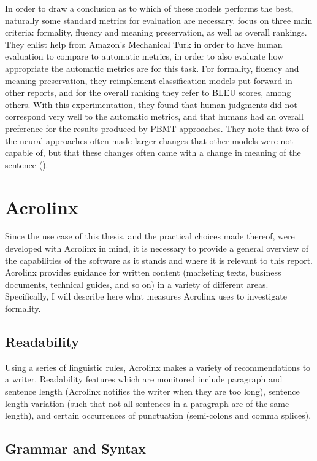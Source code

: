 In order to draw a conclusion as to which of these models performs the best, naturally some standard metrics for evaluation are necessary. \cite{rao2018gyafc} focus on three main criteria: formality, fluency and meaning preservation, as well as overall rankings. They enlist help from Amazon's Mechanical Turk in order to have human evaluation to compare to automatic metrics, in order to also evaluate how appropriate the automatic metrics are for this task. For formality, fluency and meaning preservation, they reimplement classification models put forward in other reports, and for the overall ranking they refer to BLEU scores, among others. With this experimentation, they found that human judgments did not correspond very well to the automatic metrics, and that humans had an overall preference for the results produced by PBMT approaches. They note that two of the neural approaches often made larger changes that other models were not capable of, but that these changes often came with a change in meaning of the sentence (\cite{rao2018gyafc}).

\section{Acrolinx} \label{acrolinx}

Since the use case of this thesis, and the practical choices made thereof, were developed with Acrolinx in mind, it is necessary to provide a general overview of the capabilities of the software as it stands and where it is relevant to this report. Acrolinx provides guidance for written content (marketing texts, business documents, technical guides, and so on) in a variety of different areas. Specifically, I will describe here what measures Acrolinx uses to investigate formality.

\subsection{Readability}

Using a series of linguistic rules, Acrolinx makes a variety of recommendations to a writer. Readability features which are monitored include paragraph and sentence length (Acrolinx notifies the writer when they are too long), sentence length variation (such that not all sentences in a paragraph are of the same length), and certain occurrences of punctuation (semi-colons and comma splices).

\subsection{Grammar and Syntax}


